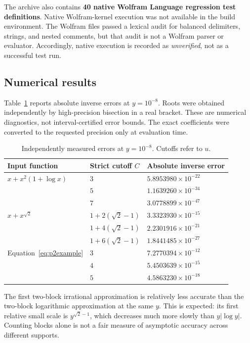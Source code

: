 \documentclass[11pt,a4paper]{article}
\numberwithin{equation}{section}
\theoremstyle{definition}
\theoremstyle{remark}
\begin{document}
The archive also contains \textbf{40 native Wolfram Language regression
test definitions}. Native Wolfram-kernel execution was not available in
the build environment. The Wolfram files passed a lexical audit for
balanced delimiters, strings, and nested comments, but that audit is not a
Wolfram parser or evaluator. Accordingly, native execution is recorded as
\emph{unverified}, not as a successful test run.

\subsection{Numerical results}

Table~\ref{tab:numerical} reports absolute inverse errors at $y=10^{-8}$.
Roots were obtained independently by high-precision bisection in a real
bracket. These are numerical diagnostics, not interval-certified error
bounds. The exact coefficients were converted to the requested precision
only at evaluation time.

\begin{table}[htbp]
\centering
\caption{Independently measured errors at $y=10^{-8}$. Cutoffs refer to $u$.}
\label{tab:numerical}
\begin{tabular}{@{}lll@{}}
\toprule
Input function & Strict cutoff $C$ & Absolute inverse error\\
\midrule
$x+x^2(1+\log x)$ & $3$ & $5.8953980\times10^{-22}$\\
 & $5$ & $1.1639260\times10^{-34}$\\
 & $7$ & $3.0778899\times10^{-47}$\\[2pt]
$x+x^{\sqrt2}$ & $1+2(\sqrt2-1)$ & $3.3323930\times10^{-15}$\\
 & $1+4(\sqrt2-1)$ & $2.2301916\times10^{-21}$\\
 & $1+6(\sqrt2-1)$ & $1.8441485\times10^{-27}$\\[2pt]
Equation~\eqref{eq:p2example} & $3$ & $7.2770394\times10^{-12}$\\
 & $4$ & $5.4503639\times10^{-15}$\\
 & $5$ & $4.5863230\times10^{-18}$\\
\bottomrule
\end{tabular}
\end{table}

The first two-block irrational approximation is relatively less accurate
than the two-block logarithmic approximation at the same $y$. This is
expected: its first relative small scale is $y^{\sqrt2-1}$, which decreases
much more slowly than $y|\log y|$. Counting blocks alone is not a fair
measure of asymptotic accuracy across different supports.
\end{document}
